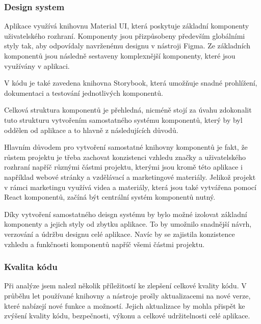 
\subsubsection{Design system}

Aplikace využívá knihovnu Material UI, %
která poskytuje základní komponenty uživatelského rozhraní. Komponenty jsou přizpůsobeny především globálními styly tak, aby odpovídaly navrženému designu v nástroji Figma. Ze základních komponentů jsou následně sestaveny komplexnější komponenty, které jsou využívány v aplikaci. 

V kódu je také zavedena knihovna Storybook, která umožňuje snadné prohlížení, dokumentaci a testování jednotlivých komponentů.

Celková struktura komponentů je přehledná, nicméně stojí za úvahu zdokonalit tuto strukturu vytvořením samostatného systému komponentů, který by byl oddělen od aplikace a to hlavně z následujících důvodů.

Hlavním důvodem pro vytvoření samostatné knihovny komponentů je fakt, že růstem projektu je třeba zachovat konzistenci vzhledu značky a uživatelského rozhraní napříč různými částmi projektu, kterými jsou kromě této aplikace i například webové stránky a vzdělávací a marketingové materiály. Jelikož projekt v rámci marketingu využívá videa a materiály, která jsou také vytvářena pomocí React komponentů, začíná být centrální systém komponentů nutný.

Díky vytvoření samostatného deisgn systému by bylo možné izolovat základní komponenty a jejich styly od zbytku aplikace. To by umožnilo snadnější návrh, verzování a údržbu designu celé aplikace. Navíc by se zajistila konzistence vzhledu a funkčnosti komponentů napříč všemi částmi projektu.

\subsubsection{Kvalita kódu}


Při analýze jsem nalezl několik příležitostí ke zlepšení celkové kvality kódu. V průběhu let používané knihovny a nástroje prošly aktualizacemi na nové verze, které nabízejí nové funkce a možností. Jejich aktualizace by mohla přispět ke zvýšení kvality kódu, bezpečnosti, výkonu a celkové udržitelnosti celé aplikace.

